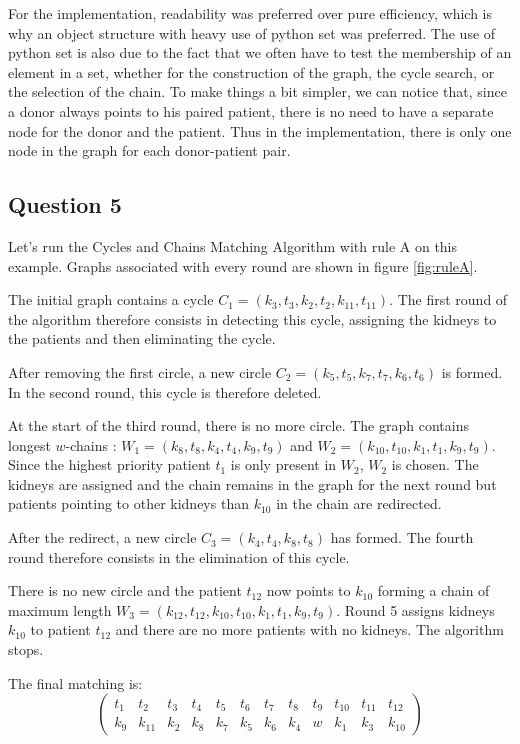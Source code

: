 \documentclass[english]{article}
\begin{document}
For the implementation, readability was preferred over pure efficiency, which is why an object structure with heavy use of python set was preferred. The use of python set is also due to the fact that we often have to test the membership of an element in a set, whether for the construction of the graph, the cycle search, or the selection of the chain.
To make things a bit simpler, we can notice that, since a donor always points to his paired patient, there is no need to have a separate node for the donor and the patient. Thus in the implementation, there is only one node in the graph for each donor-patient pair.

\subsection*{Question 5}

Let's run the Cycles and Chains Matching Algorithm with rule A on this example. Graphs associated with every round are shown in figure \ref{fig:ruleA}.

The initial graph contains a cycle $C_1 = (k_3, t_3, k_2, t_2, k_{11}, t_{11})$. The first round of the algorithm therefore consists in detecting this cycle, assigning the kidneys to the patients and then eliminating the cycle.

After removing the first circle, a new circle $C_2 = (k_5, t_5, k_7, t_7, k_6, t_6)$ is formed. In the second round, this cycle is therefore deleted.

At the start of the third round, there is no more circle. The graph contains longest $w$-chains : $W_1 = (k_8, t_8, k_4, t_4, k_9, t_9)$ and $W_2 = (k_{10}, t_{10}, k_1, t_1, k_9, t_9)$. Since the highest priority patient $ t_1 $ is only present in $W_2$,  $W_2$ is chosen. The kidneys are assigned and the chain remains in the graph for the next round but patients pointing to other kidneys than $k_{10}$ in the chain are redirected.

After the redirect, a new circle $ C_3 = (k_4, t_4, k_8, t_8)$ has formed. The fourth round therefore consists in the elimination of this cycle.

There is no new circle and the patient $ t_{12} $ now points to $ k_{10} $ forming a chain of maximum length $ W_3 = (k_{12}, t_{12}, k_{10}, t_{10}, k_1, t_1, k_9, t_9) $. Round 5 assigns kidneys $ k_{10} $ to patient $ t_{12} $ and there are no more patients with no kidneys. The algorithm stops.

The final matching is:
\begin{equation*}
\left(
\begin{matrix}
    t_1 & t_2 & t_3 & t_4 & t_5 & t_6 & t_7 & t_8 & t_9 & t_{10} & t_{11} & t_{12} \\
    k_9 & k_{11} & k_2 & k_8 & k_7 & k_5 & k_6 & k_4 & w & k_1 & k_3 & k_{10}
\end{matrix}
\right)
\end{equation*}
\end{document}
